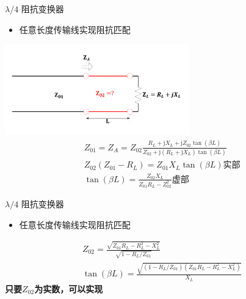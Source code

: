 \begin{frame}{$\lambda/4$ 阻抗变换器}
  \begin{itemize}
    \item 任意长度传输线实现阻抗匹配
  \end{itemize}
  \centering
  \includegraphics[width=8cm]{Cha4//fig4-31.pdf}
  \begin{align*}
     & Z_{01}=Z_A=Z_{02}\frac{R_L+\mathrm{j}X_L+\mathrm{j}Z_{02}\tan(\beta L)}{Z_{02}+\mathrm{j}(R_L+\mathrm{j}X_L)\tan(\beta L)} \\
     & Z_{02}(Z_{01}-R_L)=Z_{01}X_L\tan(\beta L) \text{实部}\\
     & \tan(\beta L)=\frac{Z_{02}X_L}{Z_{01}R_L-Z_{02}^2} \text{虚部}
  \end{align*}
\end{frame}

\begin{frame}{$\lambda/4$ 阻抗变换器}
  \begin{itemize}
    \item 任意长度传输线实现阻抗匹配
  \end{itemize}
   \begin{align*}
     & Z_{02}=\frac{\sqrt{Z_{01}R_L-R_L^2-X_L^2}}{\sqrt{1-R_L/Z_{01}}}\\
     & \tan(\beta L)=\frac{\sqrt{(1-R_L/Z_{01})(Z_{01}R_L-R_L^2-X_L^2)}}{X_L} 
  \end{align*}
  \textbf{只要$Z_{02}$为实数，可以实现}
\end{frame}

